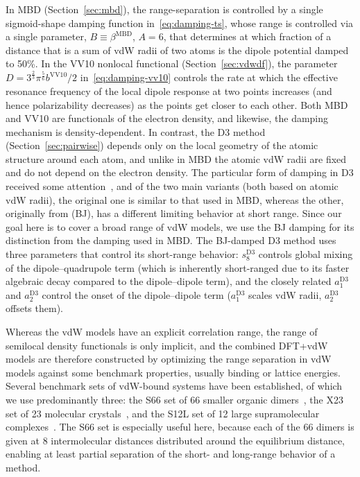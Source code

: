 In MBD (Section~\ref{sec:mbd}), the range-separation is controlled by a single sigmoid-shape damping function in~\eqref{eq:damping-ts}, whose range is controlled via a single parameter, $B\equiv\beta^\text{MBD}$, $A=6$, that determines at which fraction of a distance that is a sum of vdW radii of two atoms is the dipole potential damped to 50\%.
In the VV10 nonlocal functional (Section~\ref{sec:vdwdf}), the parameter $D=3^\frac23\pi^\frac56b^\text{VV10}/2$ in~\eqref{eq:damping-vv10} controls the rate at which the effective resonance frequency of the local dipole response at two points increases (and hence polarizability decreases) as the points get closer to each other.
Both MBD and VV10 are functionals of the electron density, and likewise, the damping mechanism is density-dependent.
In contrast, the D3 method (Section~\ref{sec:pairwise}) depends only on the local geometry of the atomic structure around each atom, and unlike in MBD the atomic vdW radii are fixed and do not depend on the electron density.
The particular form of damping in D3 received some attention~\cite{GrimmeJCC11,SchroderJCTC15,SmithJPCL16,WitteJCTC17}, and of the two main variants (both based on atomic vdW radii), the original one is similar to that used in MBD, whereas the other, originally from \citet{JohnsonJCP06} (BJ), has a different limiting behavior at short range.
Since our goal here is to cover a broad range of vdW models, we use the BJ damping for its distinction from the damping used in MBD\@.
The BJ-damped D3 method uses three parameters that control its short-range behavior: $s_8^\text{D3}$ controls global mixing of the dipole--quadrupole term (which is inherently short-ranged due to its faster algebraic decay compared to the dipole--dipole term), and the closely related $a_1^\text{D3}$ and $a_2^\text{D3}$ control the onset of the dipole--dipole term ($a_1^\text{D3}$ scales vdW radii, $a_2^\text{D3}$ offsets them).

Whereas the vdW models have an explicit correlation range, the range of semilocal density functionals is only implicit, and the combined DFT+vdW models are therefore constructed by optimizing the range separation in vdW models against some benchmark properties, usually binding or lattice energies.
Several benchmark sets of vdW-bound systems have been established, of which we use predominantly three: the S66 set of 66 smaller organic dimers~\cite{RezacJCTC11}, the X23 set of 23 molecular crystals~\cite{Otero-de-la-RozaJCP12,ReillyJCP13}, and the S12L set of 12 large supramolecular complexes~\cite{GrimmeCEJ12}.
The S66 set is especially useful here, because each of the 66 dimers is given at 8 intermolecular distances distributed around the equilibrium distance, enabling at least partial separation of the short- and long-range behavior of a method.


